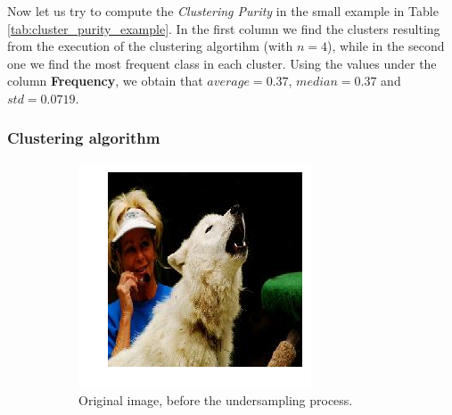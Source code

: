 \documentclass[12pt, twoside, a4paper]{report}
\begin{document}
Now let us try to compute the \textit{Clustering Purity} in the small example in Table \ref{tab:cluster_purity_example}. In the first column we find the clusters resulting from the execution of the clustering algortihm (with $n=4$), while in the second one we find the most frequent class in each cluster. Using the values under the column \textbf{Frequency}, we obtain that $average=0.37$, $median=0.37$ and $std=0.0719$.


\subsubsection{Clustering algorithm}



\begin{figure}
\centering
\begin{subfigure}[b]{.49\linewidth}
\includegraphics[width=\linewidth]{images/undersamp-orig.png}
\caption{Original image, before the undersampling process.}
\label{subfig:undersamp-orig}
\end{subfigure}
\begin{subfigure}[b]{.465\linewidth}

\end{subfigure}
\end{figure}
\end{document}
